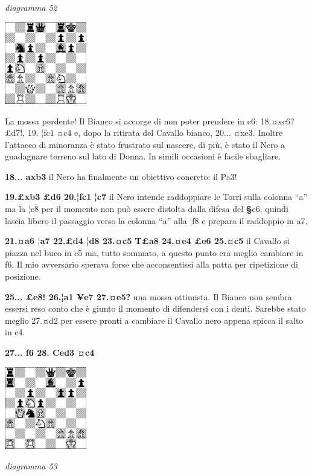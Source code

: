 \documentclass[
]{article}
\begin{document}
\emph{diagramma 52}

\includegraphics[width=1.40972in,height=1.40972in]{vertopal_109f12be458a423d8f3cc838880eaea2/media/image52.png}

La mossa perdente! Il Bianco si accorge di non poter prendere in c6:
18.¤xc6? £d7!, 19. ¦fc1 ¤c4 e, dopo la ritirata del Cavallo bianco,
20... ¤xe3. Inoltre l'attacco di minoranza è stato frustrato sul
nascere, di più, è stato il Nero a guadagnare terreno sul lato di Donna.
In simili occasioni è facile sbagliare.

\textbf{18... axb3} il Nero ha finalmente un obiettivo concreto: il Pa3!

\textbf{19.£xb3 £d6 20.¦fc1 ¦c7} il Nero intende raddoppiare le Torri
sulla colonna ``a'' ma la ¦c8 per il momento non può essere distolta
dalla difesa del \textbf{§}c6, quindi lascia libero il passaggio verso
la colonna ``a'' alla ¦f8 e prepara il raddoppio in a7.

\textbf{21.¤a6 ¦a7 22.£d4 ¦d8 23.¤c5 T£a8 24.¤e4 £e6 25.¤c5} il Cavallo
si piazza nel buco in c5 ma, tutto sommato, a questo punto era meglio
cambiare in f6. Il mio avversario sperava forse che acconsentissi alla
patta per ripetizione di posizione.

\textbf{25... £e8! 26.¦a1 ¥e7 27.¤e5?} una mossa ottimista. Il Bianco
non sembra essersi reso conto che è giunto il momento di difendersi con
i denti. Sarebbe stato meglio 27.¤d2 per essere pronti a cambiare il
Cavallo nero appena spicca il salto in c4.

\textbf{27... f6 28. Ced3 ¤c4}

\includegraphics[width=1.40972in,height=1.40972in]{vertopal_109f12be458a423d8f3cc838880eaea2/media/image53.png}

\emph{diagramma 53}
\end{document}
